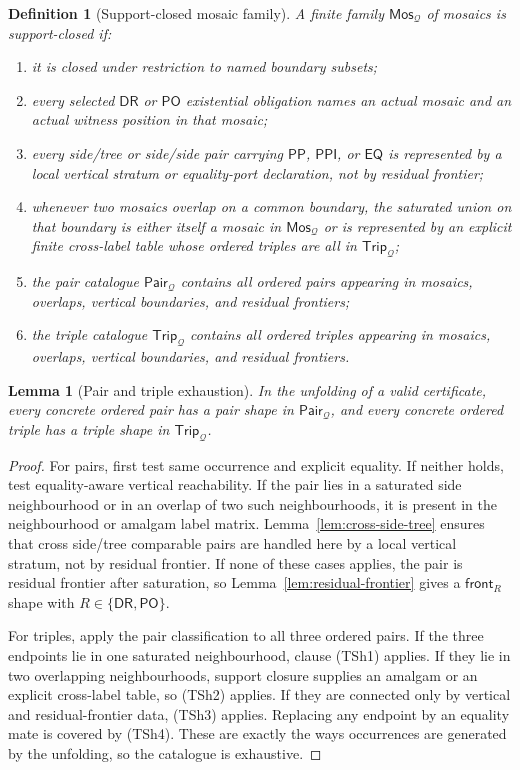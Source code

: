 \documentclass[11pt]{article}
\newtheorem{lemma}[theorem]{Lemma}
\newtheorem{definition}[theorem]{Definition}
\newcommand{\EQ}{\mathsf{EQ}}
\newcommand{\DR}{\mathsf{DR}}
\newcommand{\PO}{\mathsf{PO}}
\newcommand{\PP}{\mathsf{PP}}
\newcommand{\PPI}{\mathsf{PPI}}
\newcommand{\Q}{\mathcal Q}
\newcommand{\Mos}{\mathsf{Mos}}
\newcommand{\Pair}{\mathsf{Pair}}
\newcommand{\Trip}{\mathsf{Trip}}
\newcommand{\front}{\mathsf{front}}
\begin{document}
\begin{definition}[Support-closed mosaic family]\label{def:support-closed}
A finite family $\Mos_\Q$ of mosaics is support-closed if:
\begin{enumerate}[label=(SC\arabic*)]
\item it is closed under restriction to named boundary subsets;
\item every selected $\DR$ or $\PO$ existential obligation names an actual mosaic and an actual witness position in that mosaic;
\item every side/tree or side/side pair carrying $\PP$, $\PPI$, or $\EQ$ is represented by a local vertical stratum or equality-port declaration, not by residual frontier;
\item whenever two mosaics overlap on a common boundary, the saturated union on that boundary is either itself a mosaic in $\Mos_\Q$ or is represented by an explicit finite cross-label table whose ordered triples are all in $\Trip_\Q$;
\item the pair catalogue $\Pair_\Q$ contains all ordered pairs appearing in mosaics, overlaps, vertical boundaries, and residual frontiers;
\item the triple catalogue $\Trip_\Q$ contains all ordered triples appearing in mosaics, overlaps, vertical boundaries, and residual frontiers.
\end{enumerate}
\end{definition}

\begin{lemma}[Pair and triple exhaustion]\label{lem:pair-triple-exhaustion}
In the unfolding of a valid certificate, every concrete ordered pair has a pair shape in $\Pair_\Q$, and every concrete ordered triple has a triple shape in $\Trip_\Q$.
\end{lemma}

\begin{proof}
For pairs, first test same occurrence and explicit equality.  If neither holds, test equality-aware vertical reachability.  If the pair lies in a saturated side neighbourhood or in an overlap of two such neighbourhoods, it is present in the neighbourhood or amalgam label matrix.  Lemma~\ref{lem:cross-side-tree} ensures that cross side/tree comparable pairs are handled here by a local vertical stratum, not by residual frontier.  If none of these cases applies, the pair is residual frontier after saturation, so Lemma~\ref{lem:residual-frontier} gives a $\front_R$ shape with $R\in\{\DR,\PO\}$.

For triples, apply the pair classification to all three ordered pairs.  If the three endpoints lie in one saturated neighbourhood, clause (TSh1) applies.  If they lie in two overlapping neighbourhoods, support closure supplies an amalgam or an explicit cross-label table, so (TSh2) applies.  If they are connected only by vertical and residual-frontier data, (TSh3) applies.  Replacing any endpoint by an equality mate is covered by (TSh4).  These are exactly the ways occurrences are generated by the unfolding, so the catalogue is exhaustive.
\end{proof}
\end{document}

